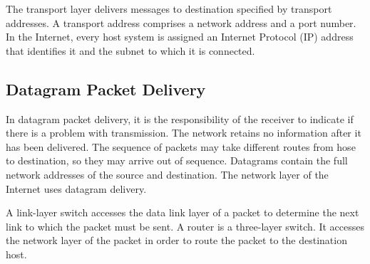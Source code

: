 The transport layer delivers messages to destination specified by transport addresses.
A transport address comprises a network address and a port number.
In the Internet, every host system is assigned an Internet Protocol (IP) address that identifies it and the subnet to which it is connected.

\subsection{Datagram Packet Delivery}

In datagram packet delivery, it is the responsibility of the receiver to indicate if there is a problem with transmission.
The network retains no information after it has been delivered.
The sequence of packets may take different routes from hose to destination, so they may arrive out of sequence.
Datagrams contain the full network addresses of the source and destination.
The network layer of the Internet uses datagram delivery.

A link-layer switch accesses the data link layer of a packet to determine the next link to which the packet must be sent.
A router is a three-layer switch.
It accesses the network layer of the packet in order to route the packet to the destination host.
